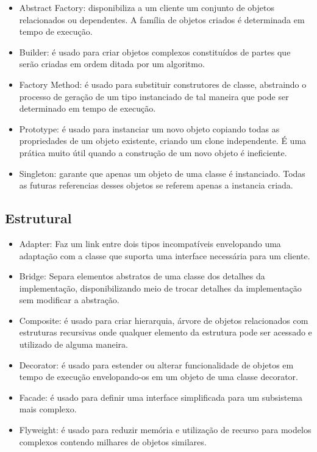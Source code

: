 \begin{itemize}
	\item Abstract Factory: disponibiliza a um cliente um conjunto de objetos relacionados ou dependentes. A família de objetos criados é determinada em tempo de execução.
	\item Builder: é usado para criar objetos complexos constituídos de partes que serão criadas em ordem ditada por um algoritmo. 
	\item Factory Method: é usado para substituir construtores de classe, abstraindo o processo de geração de um tipo instanciado de tal maneira que pode ser determinado em tempo de execução.
	\item Prototype: é usado para instanciar um novo objeto copiando todas as propriedades de um objeto existente, criando um clone independente. É uma prática muito útil quando a construção de um novo objeto é ineficiente.
	\item Singleton: garante que apenas um objeto de uma classe é instanciado. Todas as futuras referencias desses objetos se referem apenas a instancia criada.
\end{itemize}


\subsection{Estrutural}

\begin{itemize}
	\item Adapter: Faz um link entre dois tipos incompatíveis envelopando uma adaptação com a classe que suporta uma interface necessária para um cliente.
	\item Bridge: Separa elementos abstratos de uma classe dos detalhes da implementação, disponibilizando meio de trocar detalhes da implementação sem modificar a abstração.
	\item Composite: é usado para criar hierarquia, árvore de objetos relacionados com estruturas recursivas onde qualquer elemento da estrutura pode ser acessado e utilizado de alguma maneira.
	\item Decorator: é usado para estender ou alterar funcionalidade de objetos em tempo de execução envelopando-os em um objeto de uma classe decorator.
	\item Facade: é usado para definir uma interface simplificada para um subsistema mais complexo.
	\item Flyweight: é usado para reduzir memória e utilização de recurso para modelos complexos contendo milhares de objetos similares.
\end{itemize}


